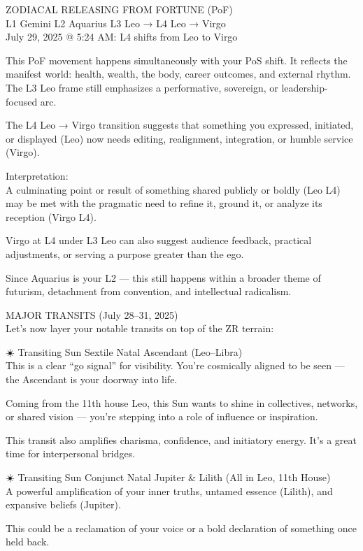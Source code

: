 \documentclass{article}
\begin{document}
 ZODIACAL RELEASING FROM FORTUNE (PoF)\\
L1 Gemini \textbar{} L2 Aquarius \textbar{} L3 Leo → L4 Leo → Virgo\\
July 29, 2025 @ 5:24 AM: L4 shifts from Leo to Virgo

This PoF movement happens simultaneously with your PoS shift. It
reflects the manifest world: health, wealth, the body, career outcomes,
and external rhythm.\\
The L3 Leo frame still emphasizes a performative, sovereign, or
leadership-focused arc.

The L4 Leo → Virgo transition suggests that something you expressed,
initiated, or displayed (Leo) now needs editing, realignment,
integration, or humble service (Virgo).

Interpretation:\\
A culminating point or result of something shared publicly or boldly
(Leo L4) may be met with the pragmatic need to refine it, ground it, or
analyze its reception (Virgo L4).

Virgo at L4 under L3 Leo can also suggest audience feedback, practical
adjustments, or serving a purpose greater than the ego.

Since Aquarius is your L2 --- this still happens within a broader theme
of futurism, detachment from convention, and intellectual radicalism.

 MAJOR TRANSITS (July 28--31, 2025)\\
Let's now layer your notable transits on top of the ZR terrain:

☀️ Transiting Sun Sextile Natal Ascendant (Leo--Libra)\\
This is a clear ``go signal'' for visibility. You're cosmically aligned
to be seen --- the Ascendant is your doorway into life.

Coming from the 11th house Leo, this Sun wants to shine in collectives,
networks, or shared vision --- you're stepping into a role of influence
or inspiration.

This transit also amplifies charisma, confidence, and initiatory energy.
It's a great time for interpersonal bridges.

☀️ Transiting Sun Conjunct Natal Jupiter \& Lilith (All in Leo, 11th
House)\\
A powerful amplification of your inner truths, untamed essence (Lilith),
and expansive beliefs (Jupiter).

This could be a reclamation of your voice or a bold declaration of
something once held back.
\end{document}
